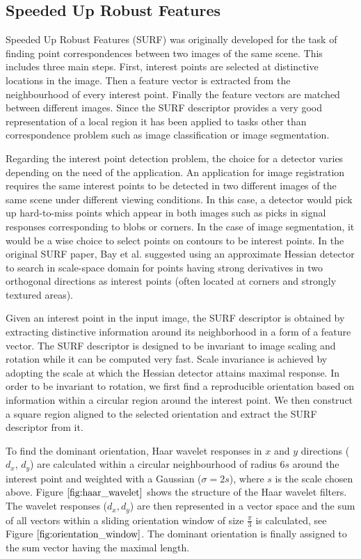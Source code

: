 \documentclass{SMBV12}
\begin{document}
\subsection{Speeded Up Robust Features}
\label{sec:surf}
Speeded Up Robust Features (SURF) \cite{bay2006surf} was originally developed for the task of finding point correspondences between two images of the same scene. This includes three main steps. First, interest points are selected at distinctive locations in the image. Then a feature vector is extracted from the neighbourhood of every interest point. Finally the feature vectors are matched between different images. Since the SURF descriptor provides a very good representation of a local region it has been applied to tasks other than correspondence problem such as image classification or image segmentation.

Regarding the interest point detection problem, the choice for a detector varies depending on the need of the application. An application for image registration requires the same interest points to be detected in two different images of the same scene under different viewing conditions. In this case, a detector would pick up hard-to-miss points which appear in both images such as picks in signal responses corresponding to blobs or corners. In the case of image segmentation, it would be a wise choice to select points on contours to be interest points. In the original SURF paper, Bay et al. suggested using an approximate Hessian detector to search in scale-space domain for points having strong derivatives in two orthogonal directions as interest points (often located at corners and strongly textured areas).

Given an interest point in the input image, the SURF descriptor is obtained by extracting distinctive information around its neighborhood in a form of a feature vector. The SURF descriptor is designed to be invariant to image scaling and rotation while it can be computed very fast. Scale invariance is achieved by adopting the scale at which the Hessian detector attains maximal response. In order to be invariant to rotation, we first find a reproducible orientation based on information within a circular region around the interest point. We then construct a square region aligned to the selected orientation and extract the SURF descriptor from it.

To find the dominant orientation, Haar wavelet responses in $x$ and $y$ directions ($d_x$, $d_y$) are calculated within a circular neighbourhood of radius $6s$ around the interest point and weighted with a Gaussian ($\sigma = 2s$), where $s$ is the scale chosen above. Figure $\ref{fig:haar_wavelet}$ shows the structure of the Haar wavelet filters. The wavelet responses ($d_x, d_y$) are then represented in a vector space and the sum of all vectors within a sliding orientation window of size $\frac{\pi}{3}$ is calculated, see Figure $\ref{fig:orientation_window}$. The dominant orientation is finally assigned to the sum vector having the maximal length.
\end{document}
